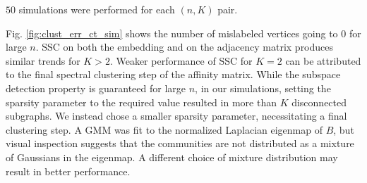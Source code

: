 \documentclass[12pt]{article}
\begin{document}
\(50\) simulations were performed for each \((n, K)\) pair.

Fig. \ref{fig:clust_err_ct_sim} shows the number of mislabeled vertices
going to 0 for large \(n\). SSC on both the embedding and on the
adjacency matrix produces similar trends for \(K > 2\). Weaker
performance of SSC for \(K = 2\) can be attributed to the final spectral
clustering step of the affinity matrix. 
While the subspace detection property is guaranteed for large \(n\), in our
simulations, setting the sparsity parameter to the required value resulted
in more than \(K\) disconnected subgraphs. 
We instead chose a smaller sparsity parameter, 
necessitating a final clustering step. 
A GMM was fit to the normalized Laplacian eigenmap of $B$,
but visual inspection suggests that the communities are not
distributed as a mixture of Gaussians in the eigenmap. 
A different choice of mixture distribution may result in better performance. 
\end{document}
